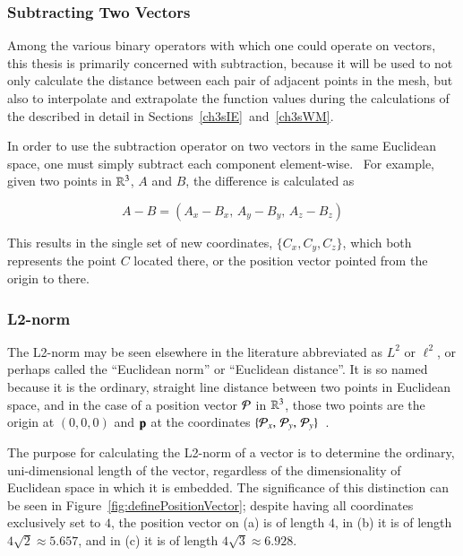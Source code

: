 %
%
\subsubsection{Subtracting Two Vectors}
\label{ch2sETBssLAsssS2V}
Among the various binary operators with which one could operate on vectors, this thesis is primarily concerned with subtraction, because it will be used to not only calculate the distance between each pair of adjacent points in the mesh, but also to interpolate and extrapolate the function values during the calculations of the  described in detail in Sections~\ref{ch3sIE}~and~\ref{ch3sWM}.

In order to use the subtraction operator on two vectors in the same Euclidean space, one must simply subtract each component element-wise.~\cite{Weisstein19j} For example, given two points in $\mathbb{R}^{3}$, $A$ and $B$, the difference is calculated as

\begin{equation}
	A - B = (A_x - B_x,\,A_y - B_y,\,A_z - B_z)
	\label{eq:vectorSubtraction}
\end{equation}

This results in the single set of new coordinates, $\{C_x, C_y, C_z\}$, which both represents the point $C$ located there, or the position vector pointed from the origin to there.

%
%
\subsubsection{L2-norm}
\label{ch2sETBssLAsssL2N}
The L2-norm may be seen elsewhere in the literature abbreviated as $L^2$ or $\ell^2$, or perhaps called the ``Euclidean norm'' or ``Euclidean distance''. It is so named because it is the ordinary, straight line distance between two points in Euclidean space, and in the case of a position vector $\mathcal{P}$ in $\mathbb{R}^{3}$, those two points are the origin at $(0, 0, 0)$ and $\mathbf{p}$ at the coordinates $\{\mathcal{P}_x,\,\mathcal{P}_y,\,\mathcal{P}_y\}$~\cite{Weisstein19h}.

The purpose for calculating the L2-norm of a vector is to determine the ordinary, uni-dimensional length of the vector, regardless of the dimensionality of Euclidean space in which it is embedded. The significance of this distinction can be seen in Figure~\ref{fig:definePositionVector}; despite having all coordinates exclusively set to $4$, the position vector on (a) is of length $4$, in (b) it is of length $4\sqrt{2} \approx 5.657$, and in (c) it is of length $4\sqrt{3} \approx 6.928$.

